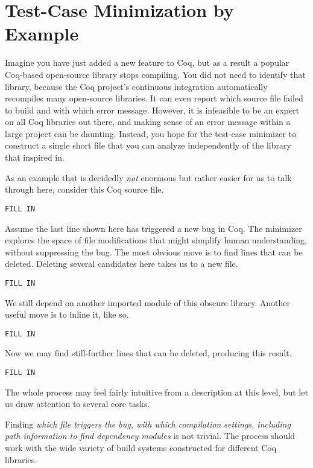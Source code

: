 \documentclass[a4paper,USenglish,cleveref,autoref,thm-restate]{lipics-v2021}
\begin{document}
\section{Test-Case Minimization by Example}\label{sec:example}

Imagine you have just added a new feature to Coq, but as a result a popular Coq-based open-source library stops compiling.
You did not need to identify that library, because the Coq project's continuous integration automatically recompiles many open-source libraries.
It can even report which source file failed to build and with which error message.
However, it is infeasible to be an expert on all Coq libraries out there, and making sense of an error message within a large project can be daunting.
Instead, you hope for the test-case minimizer to construct a single short file that you can analyze independently of the library that inspired in.

As an example that is decidedly \emph{not} enormous but rather easier for us to talk through here, consider this Coq source file.
\begin{verbatim}
FILL IN
\end{verbatim}

Assume the last line shown here has triggered a new bug in Coq.
The minimizer explores the space of file modifications that might simplify human understanding, without suppressing the bug.
The most obvious move is to find lines that can be deleted.
Deleting several candidates here takes us to a new file.
\begin{verbatim}
FILL IN
\end{verbatim}

We still depend on another imported module of this obscure library.
Another useful move is to inline it, like so.
\begin{verbatim}
FILL IN
\end{verbatim}

Now we may find still-further lines that can be deleted, producing this result.
\begin{verbatim}
FILL IN
\end{verbatim}

The whole process may feel fairly intuitive from a description at this level, but let us draw attention to several core tasks.

Finding \emph{which file triggers the bug, with which compilation settings, including path information to find dependency modules} is not trivial.
The process should work with the wide variety of build systems constructed for different Coq libraries.
\end{document}
